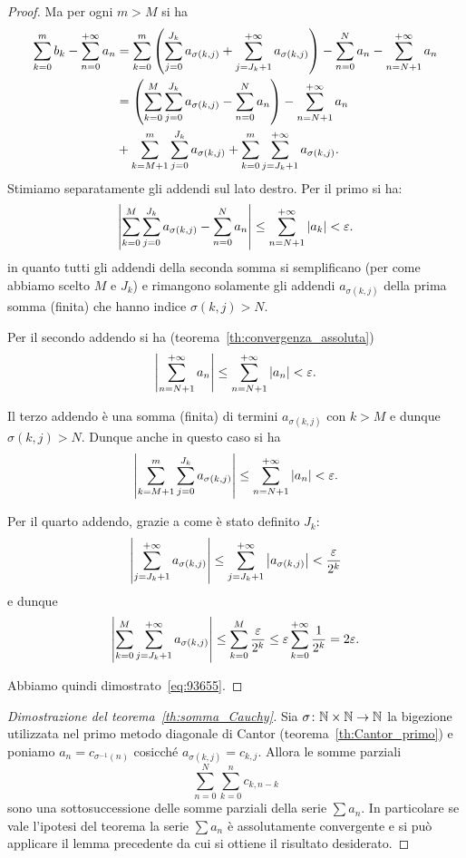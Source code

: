 \begin{proof}
Ma per ogni $m>M$ si ha
\begin{equation}\label{eq:58382}
\begin{aligned}
\sum_{k=0}^m b_k - \sum_{n=0}^{+\infty} a_n
&=\sum_{k=0}^m {\left( \sum_{j=0}^{J_k} a_{\sigma(k,j)} +
\sum_{j=J_k+1}^{+\infty} a_{\sigma(k,j)} \right)} - \sum_{n=0}^N a_n - \sum_{n=N+1}^{+\infty} a_n \\
&= {\left( \sum_{k=0}^M \sum_{j=0}^{J_k} a_{\sigma(k,j)} - \sum_{n=0}^N a_n \right)}
- \sum_{n=N+1}^{+\infty} a_n \\
\qquad &
+ \sum_{k=M+1}^{m} \sum_{j=0}^{J_k} a_{\sigma(k,j)}
+ \sum_{k=0}^{m} \sum_{j=J_k+1}^{+\infty} a_{\sigma(k,j)}.
\end{aligned}
\end{equation}
Stimiamo separatamente gli addendi sul lato destro.
Per il primo si ha:
\[
 {\left|\sum_{k=0}^M \sum_{j=0}^{J_k} a_{\sigma(k,j)} - \sum_{n=0}^N a_n\right|}
 \le \sum_{n=N+1}^{+\infty} {\left|a_k\right|} < \varepsilon.
\]
in quanto tutti gli addendi della seconda somma si semplificano
(per come abbiamo scelto $M$ e $J_k$)
e rimangono solamente gli addendi $a_{\sigma(k,j)}$
della prima somma (finita) che
hanno indice $\sigma(k,j)>N$.

Per il secondo addendo si ha (teorema~\ref{th:convergenza_assoluta})
\[
 {\left|\sum_{n=N+1}^{+\infty} a_n\right|}
 \le \sum_{n=N+1}^{+\infty} {\left|a_n\right|} < \varepsilon.
\]

Il terzo addendo è una somma (finita) di termini
$a_{\sigma(k,j)}$ con $k> M$ e dunque $\sigma(k,j)>N$.
Dunque anche in questo caso si ha
\[
{\left|\sum_{k=M+1}^{m} \sum_{j=0}^{J_k} a_{\sigma(k,j)}\right|}
\le\sum_{n=N+1}^{+\infty} {\left|a_n\right|}<\varepsilon.
\]

Per il quarto addendo, grazie a come è stato definito $J_k$:
\[
 {\left|\sum_{j=J_k+1}^{+\infty} a_{\sigma(k,j)}\right|}
 \le \sum_{j=J_k+1}^{+\infty} {\left|a_{\sigma(k,j)}\right|}
 < \frac{\varepsilon}{2^k}
\]
e dunque
\[
{\left|\sum_{k=0}^{M}\sum_{j=J_k+1}^{+\infty} a_{\sigma(k,j)}\right|}
\le \sum_{k=0}^{M} \frac{\varepsilon}{2^k}
\le \varepsilon \sum_{k=0}^{+\infty}\frac{1}{2^k} = 2\varepsilon.
\]

Abbiamo quindi dimostrato~\eqref{eq:93655}.
\end{proof}

\begin{proof}[Dimostrazione del teorema~\ref{th:somma_Cauchy}]
Sia $\sigma\colon \mathbb N\times \mathbb N\to \mathbb N$ la bigezione utilizzata
nel primo metodo diagonale di Cantor (teorema~\ref{th:Cantor_primo})
e poniamo $a_n = c_{\sigma^{-1}(n)}$ cosicché
$a_{\sigma(k,j)} = c_{k,j}$.
Allora le somme parziali
\[
  \sum_{n=0}^N \sum_{k=0}^n c_{k,n-k}
\]
sono una sottosuccessione delle somme parziali della serie
$\sum a_n$.
In particolare se vale l'ipotesi del teorema la serie
$\sum a_n$ è assolutamente convergente e si può applicare
il lemma precedente da cui si ottiene il risultato desiderato.
\end{proof}

